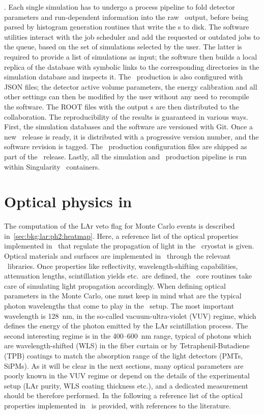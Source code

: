 $${}. Each single simulation has to undergo a process pipeline to fold detector parameters
and run-dependent information into the raw \mage\ output, before being parsed by histogram
generation routines that write the \pdf{}s to disk. The software utilities interact with the
job scheduler and add the requested or outdated jobs to the queue, based on the set of
simulations selected by the user. The latter is required to provide a list of simulations
as input; the software then builds a local replica of the database with symbolic links to
the corresponding directories in the simulation database and inspects it. The \pdf\
production is also configured with JSON files; the detector active volume parameters, the
energy calibration and all other settings can then be modified by the user without any
need to recompile the software. The ROOT files with the output \pdf{}s are then distributed
to the collaboration.
\newpar
The reproducibility of the results is guaranteed in various ways. First, the simulation
databases and the software are versioned with Git. Once a new \pdf\ release is ready, it is
distributed with a progressive version number, and the software revision is tagged. The
\pdf\ production configuration files are shipped as part of the \pdf\ release. Lastly, all the
simulation and \pdf\ production pipeline is run within Singularity~\cite{Kurtzer2017,
Singularity2020} containers.

\section{Optical physics in \mage}%
\label{sec:apdx:mage-optics}

The computation of the LAr veto flag for Monte Carlo events is described
in~\cref{sec:bkg:lar:ph2:heatmap}. Here, a reference list of the optical properties
implemented in \mage\ that regulate the propagation of light in the \gerda\ cryostat is
given.
\newpar
\sloppy Optical materials and surfaces are implemented in \mage\ through the relevant \geant\
libraries. Once properties like reflectivity, wavelength-shifting capabilities,
attenuation lengths, scintillation yields etc.~are defined, the \geant\ core routines take
care of simulating light propagation accordingly. When defining optical parameters in the
Monte Carlo, one must keep in mind what are the typical photon wavelengths that come to
play in the \gerda\ setup. The most important wavelength is 128~nm, in the so-called
vacuum-ultra-violet (VUV) regime, which defines the energy of the photon emitted by the
LAr scintillation process. The second interesting regime is in the 400--600~nm range,
typical of photons which are wavelength-shifted (WLS) in the fiber curtain or by
Tetraphenil-Butadiene (TPB) coatings to match the absorption range of the light detectors
(PMTs, SiPMs). As it will be clear in the next sections, many optical parameters are
poorly known in the VUV regime or depend on the details of the experimental setup (LAr
purity, WLS coating thickness etc.), and a dedicated measurement should be therefore
performed. In the following a reference list of the optical properties implemented in
\mage\ is provided, with references to the literature.

